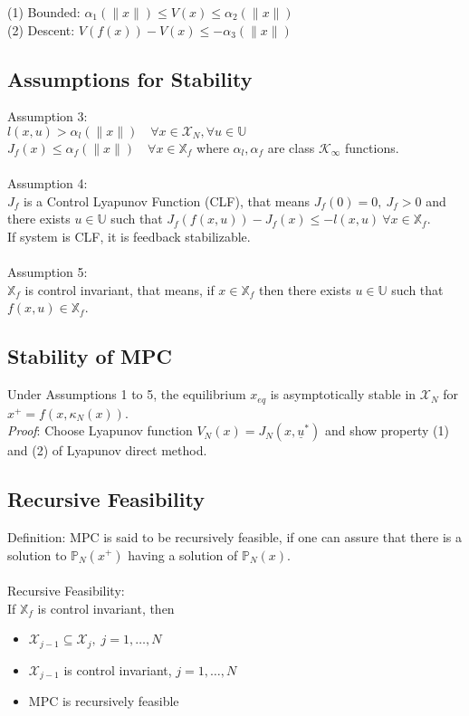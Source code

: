 \documentclass[english]{latex4ei/latex4ei_sheet}
\begin{document}
\begin{sectionbox}
\begin{emphbox}
    (1) Bounded: $\alpha_{1}(\|x\|) \leq V(x) \leq \alpha_{2}(\|x\|)$ \\ 
    (2) Descent: $V(f(x))-V(x) \leq-\alpha_{3}(\|x\|)$\\
\end{emphbox}

\subsection{Assumptions for Stability}
Assumption 3:\\
$l(x, u)>\alpha_{l}(\|x\|) \quad \forall x \in \mathcal{X}_{N}, \forall u \in \mathbb{U}$ \\ 
$J_{f}(x) \leq \alpha_{f}(\|x\|) \quad \forall x \in \mathbb{X}_{f}$ where $\alpha_{l}, \alpha_{f}$ are class $\mathcal{K}_{\infty}$ functions.\\
\\
Assumption 4:\\
$J_f$ is a Control Lyapunov Function (CLF), that means $J_f(0)=0,\ J_f>0$ and there exists $u\in\mathbb{U}$ such that $J_f(f(x,u))-J_f(x)\leq-l(x,u)\ \forall x\in\mathbb{X}_f$.\\
If system is CLF, it is feedback stabilizable.\\
\\
Assumption 5:\\
$\mathbb{X}_f$ is control invariant, that means, if $x\in\mathbb{X}_f$ then there exists $u\in\mathbb{U}$ such that $f(x,u)\in\mathbb{X}_f$.\\ 

\subsection{Stability of MPC}
Under Assumptions 1 to 5, the equilibrium $x_{eq}$ is asymptotically stable in $\mathcal{X}_N$ for $x^{+}=f(x,\kappa_{N}(x))$.\\
\textit{Proof}: Choose Lyapunov function $V_N(x)=J_N(x,\underline{u}^{*})$ and show property (1) and (2) of Lyapunov direct method.\\

\subsection{Recursive Feasibility}
Definition: MPC is said to be recursively feasible, if one can assure that there is a solution to $\mathbb{P}_N(x^{+})$ having a solution of $\mathbb{P}_N(x)$.\\
\\
Recursive Feasibility:\\
If $\mathbb{X}_f$ is control invariant, then
\begin{itemize}
    \item $\mathcal{X}_{j-1}\subseteq\mathcal{X}_{j},\;j=1,\ldots,N$
    \item $\mathcal{X}_{j-1}$ is control invariant, $j=1,\ldots,N$
    \item MPC is recursively feasible
\end{itemize}


\end{sectionbox}
\end{document}

